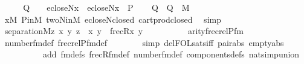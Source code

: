 \begin{isabellebody}
\isamarkupfalse%
\ {\isacharminus}{\kern0pt}\isanewline
\ \ \isamarkupfalse%
\ {\isacharquery}{\kern0pt}Q\ {\isacharequal}{\kern0pt}\ {\isachardoublequoteopen}{}\ {\isasymtimes}\ ecloseN{\isacharparenleft}{\kern0pt}x{\isacharparenright}{\kern0pt}\ {\isasymtimes}\ ecloseN{\isacharparenleft}{\kern0pt}x{\isacharparenright}{\kern0pt}\ {\isasymtimes}\ P{\isachardoublequoteclose}\isanewline
\ \ \isamarkupfalse%
\ {\isachardoublequoteopen}{\isacharquery}{\kern0pt}Q\ {\isasymtimes}\ {\isacharquery}{\kern0pt}Q\ {\isasymin}\ M{\isachardoublequoteclose}\isanewline
\ \ \ \ \isamarkupfalse%
\ {\isacartoucheopen}x{\isasymin}M{\isacartoucheclose}\ P{\isacharunderscore}{\kern0pt}in{\isacharunderscore}{\kern0pt}M\ twoN{\isacharunderscore}{\kern0pt}in{\isacharunderscore}{\kern0pt}M\ ecloseN{\isacharunderscore}{\kern0pt}closed\ cartprod{\isacharunderscore}{\kern0pt}closed\ \isamarkupfalse%
\ simp\isanewline
\ \ \isamarkupfalse%
\isanewline
\ \ \isamarkupfalse%
\ {\isachardoublequoteopen}separation{\isacharparenleft}{\kern0pt}{\isacharhash}{\kern0pt}{\isacharhash}{\kern0pt}M{\isacharcomma}{\kern0pt}{\isasymlambda}z{\isachardot}{\kern0pt}\ {\isasymexists}x\ y{\isachardot}{\kern0pt}\ z\ {\isacharequal}{\kern0pt}\ {\isasymlangle}x{\isacharcomma}{\kern0pt}\ y{\isasymrangle}\ {\isasymand}\ frecR{\isacharparenleft}{\kern0pt}x{\isacharcomma}{\kern0pt}\ y{\isacharparenright}{\kern0pt}{\isacharparenright}{\kern0pt}{\isachardoublequoteclose}\isanewline
\ \ \isamarkupfalse%
\ {\isacharminus}{\kern0pt}\isanewline
\ \ \ \ \isamarkupfalse%
\ {\isachardoublequoteopen}arity{\isacharparenleft}{\kern0pt}frecrelP{\isacharunderscore}{\kern0pt}fm{\isacharparenleft}{\kern0pt}{}{\isacharparenright}{\kern0pt}{\isacharparenright}{\kern0pt}\ {\isacharequal}{\kern0pt}\ {}{\isachardoublequoteclose}\isanewline
\ \ \ \ \ \ \isamarkupfalse%
\ number{}{\isacharunderscore}{\kern0pt}fm{\isacharunderscore}{\kern0pt}def\ frecrelP{\isacharunderscore}{\kern0pt}fm{\isacharunderscore}{\kern0pt}def\isanewline
\ \ \ \ \ \ \isamarkupfalse%
\ {\isacharparenleft}{\kern0pt}simp\ del{\isacharcolon}{\kern0pt}FOL{\isacharunderscore}{\kern0pt}sats{\isacharunderscore}{\kern0pt}iff\ pair{\isacharunderscore}{\kern0pt}abs\ empty{\isacharunderscore}{\kern0pt}abs\isanewline
\ \ \ \ \ \ \ \ \ \ add{\isacharcolon}{\kern0pt}\ fm{\isacharunderscore}{\kern0pt}defs\ frecR{\isacharunderscore}{\kern0pt}fm{\isacharunderscore}{\kern0pt}def\ number{}{\isacharunderscore}{\kern0pt}fm{\isacharunderscore}{\kern0pt}def\ components{\isacharunderscore}{\kern0pt}defs\ nat{\isacharunderscore}{\kern0pt}simp{\isacharunderscore}{\kern0pt}union{\isacharparenright}{\kern0pt}\isanewline

\end{isabellebody}
